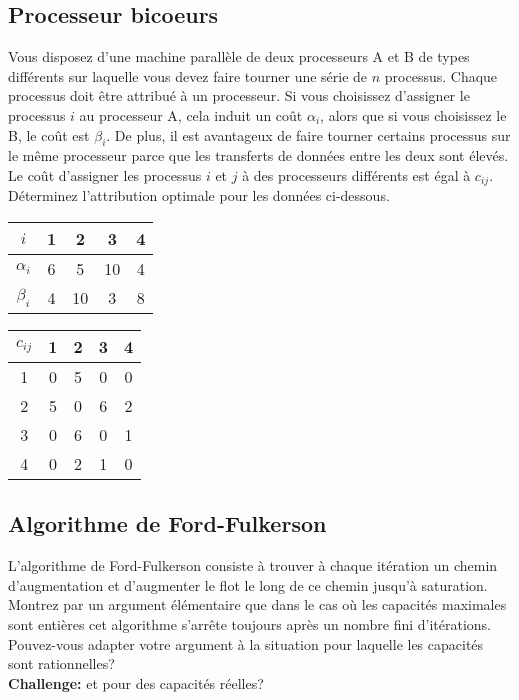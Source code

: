 \subsection{Processeur bicoeurs}
Vous disposez d'une machine parallèle de deux processeurs A et B de types différents sur laquelle vous devez faire tourner une série de $n$ processus. Chaque processus doit être attribué à un processeur. Si vous choisissez d'assigner le processus $i$ au processeur A, cela induit un coût $\alpha_i$, alors que si vous choisissez le B, le coût est $\beta_i$. De plus, il est avantageux de faire tourner certains processus sur le même processeur parce que les transferts de données entre les deux sont élevés. Le coût d'assigner les processus $i$ et $j$ à des processeurs différents est égal à $c_{ij}$. Déterminez l'attribution optimale pour les données ci-dessous. 

\begin{multicols}{2}

\begin{center}
\begin{tabular}{||c||c|c|c|c||}
\hline
$i$ & 1 & 2 & 3 & 4 \\ 
\hline
$\alpha_i$ & 6 & 5 & 10 & 4 \\
\hline
$\beta_i$ & 4 & 10 & 3 & 8 \\
\hline
\end{tabular}
\end{center}

\columnbreak


\begin{center}
\begin{tabular}{||c||c|c|c|c||}
\hline
$c_{ij}$ & 1 & 2 & 3 & 4 \\ 
\hline
1 & 0 & 5 & 0 & 0 \\
\hline
2 & 5 & 0 & 6 & 2 \\
\hline
3 & 0 & 6 & 0 & 1 \\
\hline 
4 & 0 & 2 & 1 & 0 \\
\hline
\end{tabular}
\end{center}

\end{multicols}

\subsection{Algorithme de Ford-Fulkerson}
L'algorithme de Ford-Fulkerson consiste à trouver à chaque itération un chemin d'augmentation et d'augmenter le flot le long de ce chemin jusqu'à saturation. Montrez par un argument élémentaire que dans le cas où les capacités maximales sont entières cet algorithme s'arrête toujours après un nombre fini d'itérations. Pouvez-vous adapter votre argument à la situation pour laquelle les capacités sont rationnelles? \\
\textbf{Challenge:} et pour des capacités réelles? 


